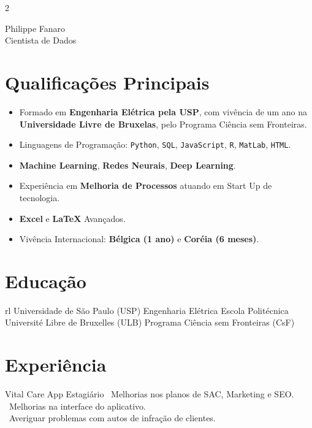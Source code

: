 \documentclass[10pt]{article} %
\newcommand{\code}[1]{\colorbox{light-gray}{\texttt{#1}}}
\begin{document}
\begin{paracol}{2}

\parbox[top][0.12\textheight][c]{\linewidth}{
	\vspace{-0.04\textheight}
	\centering
	{\sffamily\Huge Philippe Fanaro}\\\medskip
	{\huge\color{headings} Cientista de Dados}
}

\section{Qualificações Principais}

\begin{itemize}
    \itemsep0em
    \item Formado em \textbf{Engenharia Elétrica pela USP}, com vivência de um ano na \textbf{Universidade Livre de Bruxelas}, pelo Programa Ciência sem Fronteiras.
    \item Linguagens de Programação: \code{\small Python}, \code{\small SQL}, \code{\small JavaScript}, \code{\small R}, \code{\small MatLab}, \code{\small HTML}.
    \item \textbf{Machine Learning}, \textbf{Redes Neurais}, \textbf{Deep Learning}.
    \item Experiência em \textbf{Melhoria de Processos} atuando em Start Up de tecnologia.
    \item \textbf{Excel} e \textbf{LaTeX} Avançados.
    \item Vivência Internacional: \textbf{Bélgica (1 ano)} e \textbf{Coréia (6 meses)}.
\end{itemize}

\section{Educação} 

\begin{supertabular}{rl}
{Universidade de São Paulo (USP)}
{Engenharia Elétrica}
{}
{Escola Politécnica}
{Université Libre de Bruxelles (ULB)}
{Programa Ciência sem Fronteiras (CsF)}
{}
{}
\end{supertabular}

\section{Experiência}

{}
{Vital Care App}
{Estagiário}
{\textrightarrow \ Melhorias nos planos de SAC, Marketing e SEO. \\ \textrightarrow \ Melhorias na interface do aplicativo. \\ \textrightarrow \ Averiguar problemas com autos de infração de clientes.}


\end{paracol}
\end{document}
